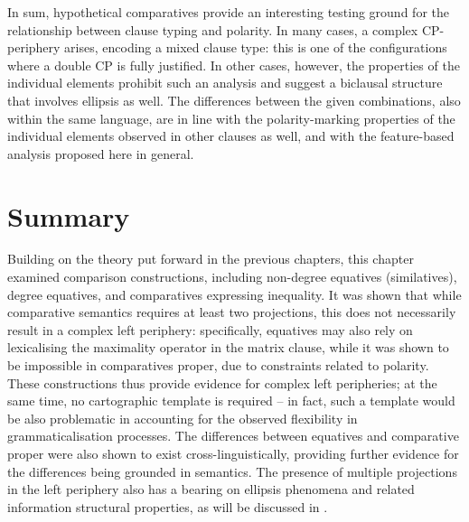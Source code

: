 In sum, hypothetical comparatives provide an interesting testing ground for the relationship between clause typing and polarity. In many cases, a complex CP-periphery arises, encoding a mixed clause type: this is one of the configurations where a double CP is fully justified. In other cases, however, the properties of the individual elements prohibit such an analysis and suggest a biclausal structure that involves ellipsis as well. The differences between the given combinations, also within the same language, are in line with the polarity-marking properties of the individual elements observed in other clauses as well, and with the feature-based analysis proposed here in general.

\section{Summary} \label{sec:5summary}
Building on the theory put forward in the previous chapters, this chapter examined comparison constructions, including non-degree equatives (similatives), degree equatives, and comparatives expressing inequality. It was shown that while comparative semantics requires at least two projections, this does not necessarily result in  a complex left periphery: specifically, equatives may also rely on lexicalising the maximality operator in the matrix clause, while it was shown to be impossible in comparatives proper, due to constraints related to polarity. These constructions thus provide evidence for complex left peripheries; at the same time, no cartographic template is required -- in fact, such a template would be also problematic in accounting for the observed flexibility in grammaticalisation processes. The differences between equatives and comparative proper were also shown to exist cross-linguistically, providing further evidence for the differences being grounded in semantics. The presence of multiple projections in the left periphery also has a bearing on ellipsis phenomena and related information structural properties, as will be discussed in .
